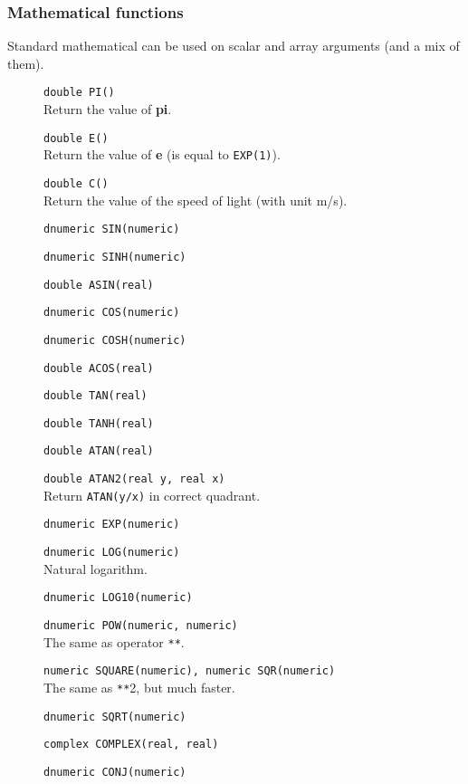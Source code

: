 \subsubsection{Mathematical functions}
Standard mathematical can be used on scalar and array arguments (and a mix of them).
\begin{description}
  \item[] \texttt{double PI()}\\
    Return the value of \textbf{pi}.
  \item[] \texttt{double E()}\\
    Return the value of \textbf{e} (is equal to \texttt{EXP(1)}).
  \item[] \texttt{double C()}\\
    Return the value of the speed of light (with unit m/s).
  \item[] \texttt{dnumeric SIN(numeric)}
  \item[] \texttt{dnumeric SINH(numeric)}
  \item[] \texttt{double ASIN(real)}
  \item[] \texttt{dnumeric COS(numeric)}
  \item[] \texttt{dnumeric COSH(numeric)}
  \item[] \texttt{double ACOS(real)}
  \item[] \texttt{double TAN(real)}
  \item[] \texttt{double TANH(real)}
  \item[] \texttt{double ATAN(real)}
  \item[] \texttt{double ATAN2(real y, real x)}\\
    Return \texttt{ATAN(y/x)} in correct quadrant.
  \item[] \texttt{dnumeric EXP(numeric)}
  \item[] \texttt{dnumeric LOG(numeric)}\\
    Natural logarithm.
  \item[] \texttt{dnumeric LOG10(numeric)}
  \item[] \texttt{dnumeric POW(numeric, numeric)}\\
    The same as operator \verb+**+.
  \item[] \texttt{numeric SQUARE(numeric),  numeric SQR(numeric)}\\
    The same as \verb+**+2, but much faster.
  \item[] \texttt{dnumeric SQRT(numeric)}
  \item[] \texttt{complex COMPLEX(real, real)}
  \item[] \texttt{dnumeric CONJ(numeric)}

\end{description}
